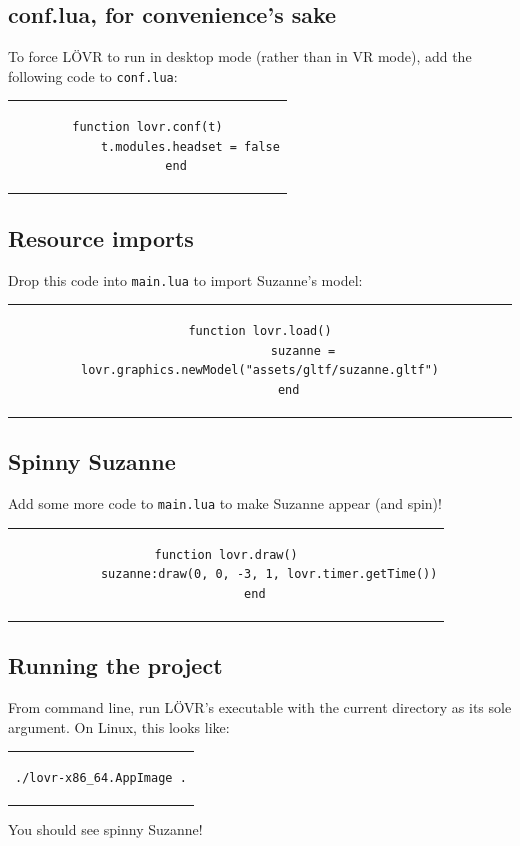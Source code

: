 \documentclass[12pt, letterpaper]{article}
\begin{document}
\subsection{conf.lua, for convenience's sake}
To force L{\"O}VR to run in desktop mode (rather than in VR mode), add the following code to \verb|conf.lua|:
\begin{center}
    \begin{tabular}{c}
        \begin{lstlisting}[language={[5.2]Lua},basicstyle=\footnotesize]
        function lovr.conf(t)
            t.modules.headset = false
        end
        \end{lstlisting}
    \end{tabular}
\end{center}

\subsection{Resource imports}
Drop this code into \verb|main.lua| to import Suzanne's model:
\begin{center}
    \begin{tabular}{c}
        \begin{lstlisting}[language={[5.2]Lua},basicstyle=\footnotesize]
        function lovr.load()
            suzanne = lovr.graphics.newModel("assets/gltf/suzanne.gltf")
        end
        \end{lstlisting}
    \end{tabular}
\end{center}

\subsection{Spinny Suzanne}
Add some more code to \verb|main.lua| to make Suzanne appear (and spin)!
\begin{center}
    \begin{tabular}{c}
        \begin{lstlisting}[language={[5.2]Lua},basicstyle=\footnotesize]
        function lovr.draw()
            suzanne:draw(0, 0, -3, 1, lovr.timer.getTime())
        end
        \end{lstlisting}
    \end{tabular}
\end{center}

\subsection{Running the project}
From command line, run L{\"O}VR's executable with the current directory as its sole argument. On Linux, this looks like:
\begin{center}
    \begin{tabular}{c}
        \begin{lstlisting}[language=Bash,basicstyle=\footnotesize]
            ./lovr-x86_64.AppImage .
        \end{lstlisting}
    \end{tabular}
\end{center}
You should see spinny Suzanne!
\end{document}
